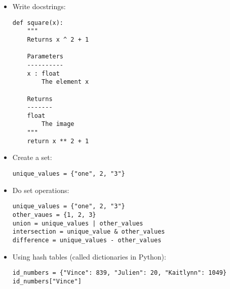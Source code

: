 \documentclass{article}
\begin{document}
\begin{itemize}
\item
  Write docstrings:

        \begin{verbatim}
def square(x):
    """
    Returns x ^ 2 + 1

    Parameters
    ----------
    x : float
        The element x

    Returns
    -------
    float
        The image
    """
    return x ** 2 + 1
        \end{verbatim}


\item
  Create a set:

        \begin{verbatim}
unique_values = {"one", 2, "3"}
        \end{verbatim}


\item
  Do set operations:

        \begin{verbatim}
unique_values = {"one", 2, "3"}
other_vaues = {1, 2, 3}
union = unique_values | other_values
intersection = unique_value & other_values
difference = unique_values - other_values
        \end{verbatim}

\item Using hash tables (called dictionaries in Python):

        \begin{verbatim}
id_numbers = {"Vince": 839, "Julien": 20, "Kaitlynn": 1049}
id_numbers["Vince"]
        \end{verbatim}
\end{itemize}
\end{document}
